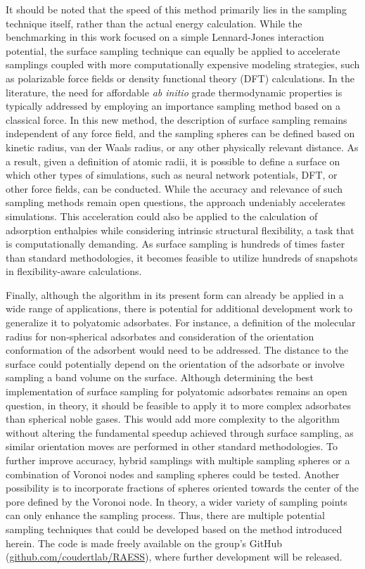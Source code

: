 \documentclass[main]{subfiles}
\begin{document}
It should be noted that the speed of this method primarily lies in the sampling technique itself, rather than the actual energy calculation. While the benchmarking in this work focused on a simple Lennard-Jones interaction potential, the surface sampling technique can equally be applied to accelerate samplings coupled with more computationally expensive modeling strategies, such as polarizable force fields or density functional theory (DFT) calculations. In the literature, the need for affordable \emph{ab initio} grade thermodynamic properties is typically addressed by employing an importance sampling method based on a classical force.\autocite{Vandenbrande2018} In this new method, the description of surface sampling remains independent of any force field, and the sampling spheres can be defined based on kinetic radius, van der Waals radius, or any other physically relevant distance. {As a result, given a definition of atomic radii, it is possible to define a surface on which other types of simulations, such as neural network potentials, DFT, or other force fields, can be conducted. While the accuracy and relevance of such sampling methods remain open questions, the approach undeniably accelerates simulations.} This acceleration could also be applied to the calculation of adsorption enthalpies while considering intrinsic structural flexibility,\autocite{Witman_2017} a task that is computationally demanding. As surface sampling is hundreds of times faster than standard methodologies, it becomes feasible to utilize hundreds of snapshots in flexibility-aware calculations.

Finally, although the algorithm in its present form can already be applied in a wide range of applications, there is potential for additional development work to generalize it to polyatomic adsorbates. For instance, {a definition of the molecular radius for non-spherical adsorbates and consideration} of the orientation conformation of the adsorbent would need to be addressed. {The distance to the surface could potentially depend on the orientation of the adsorbate or involve sampling a band volume on the surface. Although determining the best implementation of surface sampling for polyatomic adsorbates remains an open question, in theory, it should be feasible to apply it to more complex adsorbates than spherical noble gases.} This would add more complexity to the algorithm without altering the fundamental speedup achieved through surface sampling, as similar orientation moves are performed in other standard methodologies. To further improve accuracy, hybrid samplings with multiple sampling spheres or a combination of Voronoi nodes and sampling spheres could be tested. Another possibility is to incorporate fractions of spheres oriented towards the center of the pore defined by the Voronoi node. In theory, a wider variety of sampling points can only enhance the sampling process. Thus, there are multiple potential sampling techniques that could be developed based on the method introduced herein. The code is made freely available on the group's GitHub (\url{github.com/coudertlab/RAESS}), where further development will be released.
\end{document}
